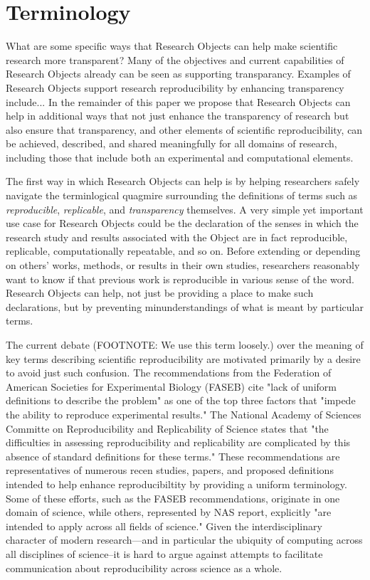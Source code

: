 \section{Terminology}

What are some specific ways that Research Objects can help make scientific research more transparent?
Many of the objectives and current capabilities of Research Objects already can be seen as supporting 
	transparancy.
Examples of Research Objects support research reproducibility by enhancing transparency include...
In the remainder of this paper we propose that Research Objects can help in additional ways that not
	just enhance the transparency of research but also ensure that transparency, and other elements
	of scientific reproducibility, can be achieved, described, and shared meaningfully for all domains
	of research, including those that include both an experimental and computational elements.

The first way in which Research Objects can help is by helping researchers safely navigate the 
	terminlogical quagmire surrounding the definitions of terms such as \emph{reproducible},
	\emph{replicable}, and \emph{transparency} themselves.
A very simple yet important use case for Research Objects could be the declaration of the senses in
	which the research study and results associated with the Object are in fact reproducible, replicable,
	computationally repeatable, and so on.
Before extending or depending on others' works, methods, or results in their own studies, researchers
	reasonably want to know if that previous work is reproducible in various sense of the word.
Research Objects can help, not just be providing a place to make such declarations, but by preventing
	minunderstandings of what is meant by particular terms.

The current debate (FOOTNOTE: We use this term loosely.)  over the meaning of key terms describing 
	scientific reproducibility are motivated primarily by a desire to avoid just such confusion.
The recommendations from the Federation of
	American Societies for Experimental Biology (FASEB) cite "lack of uniform definitions to describe the problem" 
	as one of the top three factors that "impede the ability to reproduce experimental results."
 The National Academy of Sciences Committe on Reproducibility and Replicability of Science states
	that "the difficulties in assessing reproducibility and replicability are complicated by this absence of
	standard definitions for these terms."
These recommendations are representatives of numerous recen studies, papers, and proposed definitions
	intended to help enhance reproducibiltity by providing a uniform terminology.  
Some of these efforts, such as the FASEB recommendations, originate in one domain of science,
	while others, represented by NAS report, explicitly "are intended to apply across all fields of science."
Given the interdisciplinary character of modern research---and in particular the ubiquity of computing 
	across all disciplines of science--it is hard to argue against attempts to facilitate communication about
	reproducibility across science as a whole.

